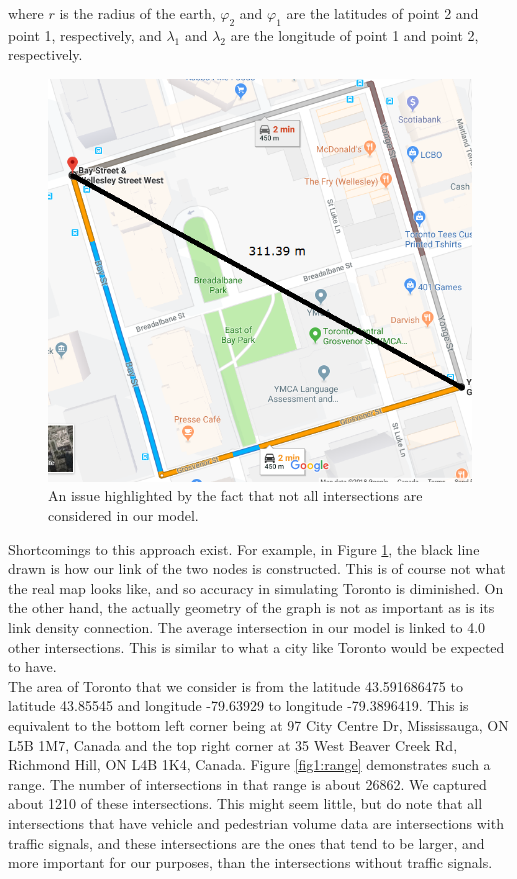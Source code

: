 \documentclass[Proceedings]{ascelike}
\begin{document}
where $r$ is the radius of the earth, $\varphi_2$ and $\varphi_1$ are the latitudes of point 2 and point 1, respectively, and $\lambda_1$ and $\lambda_2$ are the longitude of point 1 and point 2, respectively.

\begin{figure}[H]
    \centering
    \includegraphics[scale = 0.55]{shortcomings.png}
    \caption{An issue highlighted by the fact that not all intersections are considered in our model.}
    \label{fig1:short}
\end{figure}

Shortcomings to this approach exist. For example, in Figure \ref{fig1:short}, the black line drawn is how our link of the two nodes is constructed. This is of course not what the real map looks like, and so accuracy in simulating Toronto is diminished. On the other hand, the actually geometry of the graph is not as important as is its link density connection. The average intersection in our model is linked to 4.0 other intersections. This is similar to what a city like Toronto would be expected to have. \\

The area of Toronto that we consider is from the latitude 43.591686475 to latitude 43.85545 and longitude -79.63929 to longitude -79.3896419. This is equivalent to the bottom left corner being at 97 City Centre Dr, Mississauga, ON L5B 1M7, Canada and the top right corner at 35 West Beaver Creek Rd, Richmond Hill, ON L4B 1K4, Canada. Figure \ref{fig1:range} demonstrates such a range. The number of intersections in that range is about 26862. We captured about 1210 of these intersections. This might seem little, but do note that all intersections that have vehicle and pedestrian volume data are intersections with traffic signals, and these intersections are the ones that tend to be larger, and more important for our purposes, than the intersections without traffic signals.
\end{document}
